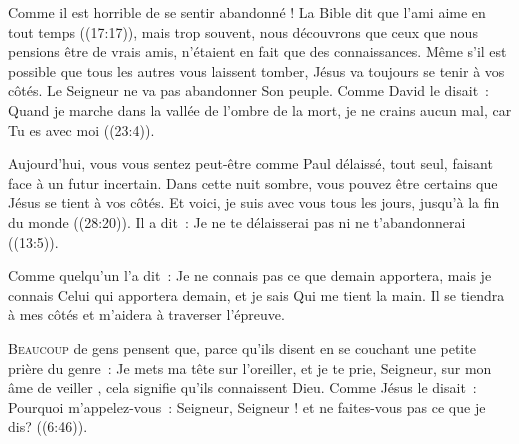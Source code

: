 Comme il est horrible de se sentir abandonné !
 La Bible dit que \Og l'ami 
 aime en tout temps \Fg{} ((17:17)), mais trop souvent,
 nous découvrons que ceux que nous pensions être de vrais amis,
 n'étaient en fait que des connaissances.
 Même s'il est possible que tous les autres vous laissent tomber,
 Jésus va toujours se tenir à vos côtés.
 Le Seigneur ne va pas abandonner Son peuple.
 Comme David le disait~: 
 \Og Quand je marche dans la vallée de l'ombre de la mort,
 je ne crains aucun mal, car Tu es avec moi \Fg{} ((23:4)).


Aujourd'hui, vous vous sentez peut-être comme Paul \ocadr délaissé,
 tout seul, faisant face à un futur incertain.
 Dans cette nuit sombre, vous pouvez être certains que Jésus
 se tient à vos côtés.
 \Og Et voici, je suis avec vous tous les jours, jusqu'à la fin du monde \Fg{}
 ((28:20)).
 Il a dit~: 
 \Og Je ne te délaisserai pas ni ne t'abandonnerai \Fg{}
 ((13:5)). 

Comme quelqu'un l'a dit~: 
 \Og Je ne connais 
 pas ce que demain apportera, mais je connais Celui qui apportera demain,
 et je sais Qui me tient la main. \Fg{}
 Il se tiendra à mes côtés et m'aidera à traverser l'épreuve. 

\dvrule






\lettrine{B}{eaucoup} de gens pensent que,
 parce qu'ils disent en se couchant une petite prière
 du genre~: 
 \Og Je mets ma tête sur l'oreiller, et je te prie, Seigneur,
 sur mon âme de veiller \Fg{}, cela signifie qu'ils connaissent Dieu.
 Comme Jésus le disait~: 
 \Og Pourquoi m'appelez-vous~: Seigneur, Seigneur !
 et ne faites-vous pas ce que je dis? \Fg{} ((6:46)).

